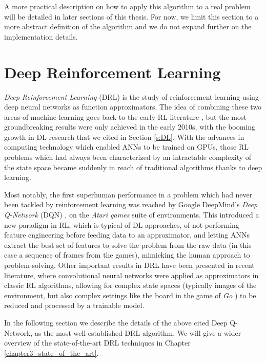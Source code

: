 A more practical description on how to apply this algorithm to a real problem
will be detailed in later sections of this thesis. For now, we limit this 
section to a more abstract definition of the algorithm and we do not expand 
further on the implementation details. 

\section{Deep Reinforcement Learning} \label{s:DRL}
\textit{Deep Reinforcement Learning} (DRL) is the study of reinforcement 
learning using deep neural networks as function approximators. 
The idea of combining these two areas of machine learning goes back to 
the early RL literature \cite{rummery1994line, tesauro1995temporal}, but the most
groundbreaking results were only achieved in the early 2010s, with the booming
growth in DL research that we cited in Section \ref{s:DL}.
With the advances in computing technology which enabled ANNs to be trained on 
GPUs, those RL problems which had always been characterized by an intractable 
complexity of the state space became suddenly in reach of traditional algorithms
thanks to deep learning.

Most notably, the first superhuman performance in a problem which had never 
been tackled by reinforcement learning was reached by Google DeepMind's 
\textit{Deep Q-Network} (DQN) \cite{mnih2015human}, on the \textit{Atari games} 
suite of environments. 
This introduced a new paradigm in RL, which is typical of DL approaches, of not 
performing feature engineering before feeding data to an approximator, and 
letting ANNs extract the best set of features to solve the problem from the 
raw data (in this case a sequence of frames from the games), mimicking the human
approach to problem-solving.
Other important results in DRL have been presented in recent literature, 
where convolutional neural networks were applied as approximators in classic
RL algorithms, allowing for complex state spaces (typically images of the 
environment, but also complex settings like the board in the game of \textit{Go}
) to be reduced and processed by a trainable model.

In the following section we describe the details of the above cited Deep 
Q-Network, as the most well-established DRL algorithm. We will give a wider 
overview of the state-of-the-art DRL techniques in Chapter \ref{chapter3_state_of_the_art}.


